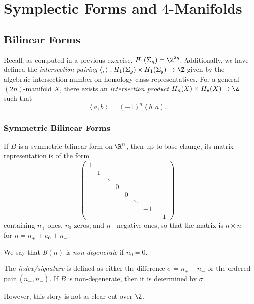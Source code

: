 \chapter*{Symplectic Forms and $4$-Manifolds}
\section{Bilinear Forms}

Recall, as computed in a previous exercise, $H_1(\Sigma_g) = \Z^{2g}$. Additionally, we have defined the \textit{intersection pairing} $\left< , \right>: H_1(\Sigma_g) \times H_1(\Sigma_g) \to \Z$ given by the algebraic intersection number on homology class representatives. For a general $(2n)$-manifold $X$, there exists an \textit{intersection product} $H_n(X) \times H_n(X) \to \Z$ such that \[\left< a,b \right> = (-1)^n\left< b,a \right>.\] 

\subsection{Symmetric Bilinear Forms}

\begin{theorem}
	If $B$ is a symmetric bilinear form on $\R^n$, then up to base change, its matrix representation is of the form \[\begin{pmatrix} 1 &&&&&&&\\ &1&&&&&& \\ &&\ddots&&&&& \\ &&&0&&&& \\ &&&&0&&& \\ &&&&&\ddots&& \\ &&&&&&-1& \\ &&&&&&&-1 \end{pmatrix} \] containing $n_+$ ones, $n_0$ zeros, and $n_-$ negative ones, so that the matrix is $n \times n$ for $n = n_+ + n_0 + n_-$.
\end{theorem}

\begin{definition}
	We say that $B(n)$ is \textit{non-degenerate} if $n_0 = 0$.
\end{definition}
\begin{definition}
	The \textit{index/signature} is defined as either the difference $\sigma = n_+ - n_-$ or the ordered pair $(n_+,n_-)$. If $B$ is non-degenerate, then it is determined by $\sigma$.
\end{definition}

However, this story is not as clear-cut over $\Z$.
